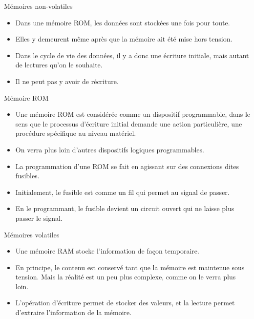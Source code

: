 \documentclass[presentation]{beamer}
\begin{document}
\begin{frame}[label={sec:org5efd6d3}]{Mémoires non-volatiles}
\begin{itemize}
\item Dans une mémoire ROM, les données sont stockées une fois pour toute.

\item Elles y demeurent même après que la mémoire ait été mise hors tension.

\item Dans le cycle de vie des données, il y a donc \alert{une} écriture initiale, mais autant de lectures qu'on le souhaite.

\item Il ne peut pas y avoir de récriture.
\end{itemize}
\end{frame}

\begin{frame}[label={sec:orgbfe93e7}]{Mémoire ROM}
\begin{itemize}
\item Une mémoire ROM est considérée comme un dispositif \alert{programmable}, dans le sens que le processus d'écriture initial demande une action particulière, une procédure spécifique au niveau matériel.

\item On verra plus loin d'autres dispositifs logiques programmables.

\item La programmation d'une ROM se fait en agissant sur des connexions dites \alert{fusibles}.

\item Initialement, le fusible est comme un fil qui permet au signal de passer.

\item En le programmant, le fusible devient un circuit ouvert qui ne laisse plus passer le signal.
\end{itemize}
\end{frame}

\begin{frame}[label={sec:orge061c44}]{Mémoires volatiles}
\begin{itemize}
\item Une mémoire RAM stocke l'information de façon temporaire.

\item En principe, le contenu est conservé tant que la mémoire est maintenue sous tension. Mais la réalité est un peu plus complexe, comme on le verra plus loin.

\item L'opération d'\alert{écriture} permet de stocker des valeurs, et la \alert{lecture} permet d'extraire l'information de la mémoire.
\end{itemize}
\end{frame}
\end{document}
